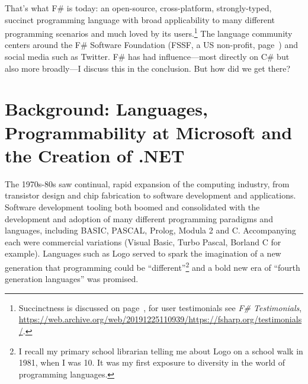 \documentclass[acmsmall]{acmart}\settopmatter{}
\begin{document}
That's what F\# is today: an open-source, cross-platform, strongly-typed, succinct programming language with broad applicability
to many different programming scenarios and much loved by its
users.\footnote{Succinctness is discussed on page~\pageref{page:fsharp-succinct}, for user testimonials see \textit{F\# Testimonials}, \url{https://web.archive.org/web/20191225110939/https://fsharp.org/testimonials/}.}  The language community centers around
the F\# Software Foundation (FSSF, a US non-profit, page~\pageref{page:community}) and social media such as Twitter. F\# has had influence---most
directly on C\# but also more broadly---I discuss this in the conclusion.  But how did we get there?

\section*{Background: Languages, Programmability at Microsoft and the Creation of .NET}

The 1970s-80s saw continual, rapid expansion of the computing industry, from transistor design and chip fabrication to
software development and applications. Software development tooling both boomed and consolidated with the development
and adoption of many different programming paradigms and languages, including BASIC, PASCAL, Prolog, Modula 2 and C.  Accompanying
each were commercial variations (Visual Basic, Turbo Pascal, Borland C for example). Languages such as Logo served to spark
the imagination of a new generation that programming could be “different”\footnote{ I recall my primary school librarian telling me
about Logo on a school walk in 1981, when I was 10. It was my first exposure to diversity in the world of programming languages.} and a
bold new era of “fourth generation languages” was promised. 
\end{document}
